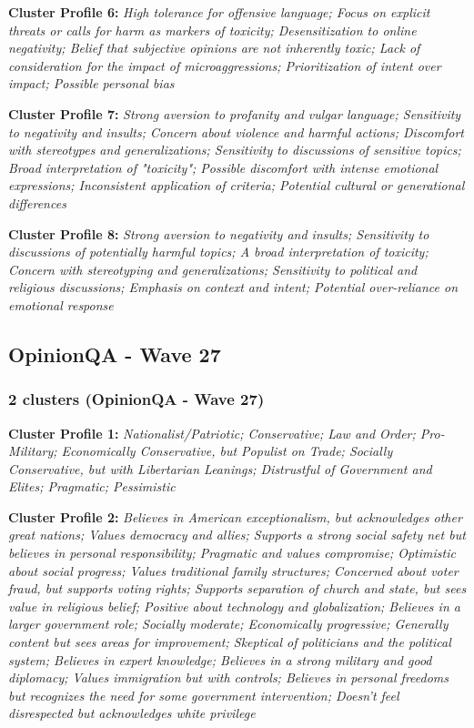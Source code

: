 \documentclass[11pt]{article}
\newcommand{\profiletext}[1]{\textit{#1}}
\begin{document}
\textbf{Cluster Profile 6:} \profiletext{High tolerance for offensive language; Focus on explicit threats or calls for harm as markers of toxicity; Desensitization to online negativity; Belief that subjective opinions are not inherently toxic; Lack of consideration for the impact of microaggressions; Prioritization of intent over impact; Possible personal bias}

\textbf{Cluster Profile 7:} \profiletext{Strong aversion to profanity and vulgar language; Sensitivity to negativity and insults; Concern about violence and harmful actions; Discomfort with stereotypes and generalizations; Sensitivity to discussions of sensitive topics; Broad interpretation of "toxicity"; Possible discomfort with intense emotional expressions; Inconsistent application of criteria; Potential cultural or generational differences}

\textbf{Cluster Profile 8:} \profiletext{Strong aversion to negativity and insults; Sensitivity to discussions of potentially harmful topics; A broad interpretation of toxicity; Concern with stereotyping and generalizations; Sensitivity to political and religious discussions; Emphasis on context and intent; Potential over-reliance on emotional response}


\subsection{OpinionQA - Wave 27}

\subsubsection{2 clusters (OpinionQA - Wave 27)}

\textbf{Cluster Profile 1:} \profiletext{Nationalist/Patriotic; Conservative; Law and Order; Pro-Military; Economically Conservative, but Populist on Trade; Socially Conservative, but with Libertarian Leanings; Distrustful of Government and Elites; Pragmatic; Pessimistic}

\textbf{Cluster Profile 2:} \profiletext{Believes in American exceptionalism, but acknowledges other great nations; Values democracy and allies; Supports a strong social safety net but believes in personal responsibility; Pragmatic and values compromise; Optimistic about social progress; Values traditional family structures; Concerned about voter fraud, but supports voting rights; Supports separation of church and state, but sees value in religious belief; Positive about technology and globalization; Believes in a larger government role; Socially moderate; Economically progressive; Generally content but sees areas for improvement; Skeptical of politicians and the political system; Believes in expert knowledge; Believes in a strong military and good diplomacy; Values immigration but with controls; Believes in personal freedoms but recognizes the need for some government intervention; Doesn't feel disrespected but acknowledges white privilege}
\end{document}
